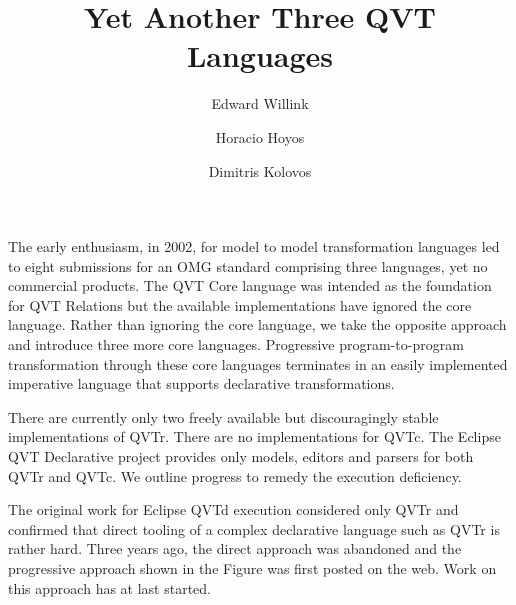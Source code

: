 \documentclass{llncs}
\begin{document}
\lstset{
basicstyle=\scriptsize,
tabsize=4,
numbers=left, numberstyle=\tiny, numbersep=5pt}

\mainmatter              %
%
\title{Yet Another Three QVT  Languages}
%
\author{Edward Willink \and Horacio Hoyos \and Dimitris Kolovos}
%

\maketitle              %

The early enthusiasm, in 2002, for model to model transformation languages led to eight submissions for an OMG standard\cite{QVT1.1} comprising three languages, yet no commercial products. The QVT Core language was intended as the foundation for QVT Relations but the available implementations have ignored the core language. Rather than ignoring the core language, we take the opposite approach and introduce three more core languages. Progressive program-to-program transformation through these core languages terminates in an easily implemented imperative language that supports declarative transformations.


There are currently only two freely available but discouragingly stable implementations of QVTr. There are no implementations for QVTc. The Eclipse QVT Declarative project provides only models, editors and parsers for both QVTr and QVTc. We outline progress to remedy the execution deficiency.

The original work for  Eclipse QVTd execution considered only QVTr and confirmed that direct tooling of a complex declarative language such as QVTr is rather hard. Three years ago, the direct approach was abandoned and the progressive approach shown in the Figure was first posted on the web. Work on this approach has at last started.
\end{document}
